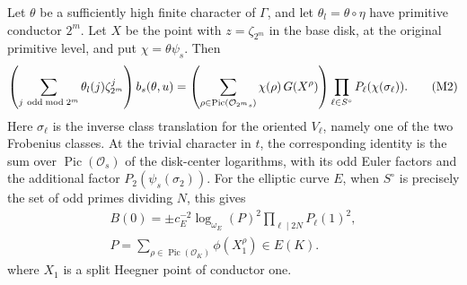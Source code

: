 \begin{proposition}
\label{split-measures:interpolation}
Let \(\theta\) be a sufficiently high finite character of \(\Gamma\), and
let \(\theta_l=\theta\circ\eta\) have primitive conductor \(2^m\).
Let \(X\) be the point with \(z=\zeta_{2^m}\) in the base disk, at the
original primitive level, and put \(\chi=\theta\psi_s\).  Then
\[
 \left(\sum_{j\ {\rm odd}\bmod 2^m}\theta_l(j)\zeta_{2^m}^{j}\right) b_s(\theta,u)
     =
 \left(\sum_{\rho\in\operatorname{Pic}(\mathcal O_{2^m s})}
                        \chi(\rho)\,G(X^\rho)\right)
                         \prod_{\ell\in S^\circ}P_\ell(\chi(\sigma_\ell)).
                                                                    \tag{M2}\label{eq:M2}
\]
Here \(\sigma_\ell\) is the inverse class translation for the oriented
\(V_\ell\), namely one of the two Frobenius classes.  At the trivial
character in \(t\), the corresponding identity is the sum over
\(\operatorname{Pic}(\mathcal O_s)\) of the disk-center logarithms, with
its odd Euler factors and the additional factor
\(P_2(\psi_s(\sigma_2))\).  For the elliptic curve \(E\), when
\(S^\circ\) is precisely the set of odd primes dividing \(N\), this gives
\[
 \begin{gathered}
 B(0)=\pm c_E^{-2}\log_{\omega_E}(P)^2
       \prod_{\ell\mid2N}P_\ell(1)^2,\\
 P=\sum_{\rho\in\operatorname{Pic}(\mathcal O_K)}
       \phi(X_1^\rho)\in E(K).
 \end{gathered}
 \tag{M3}\label{eq:M3}
\]
where \(X_1\) is a split Heegner point of conductor one.
\end{proposition}
